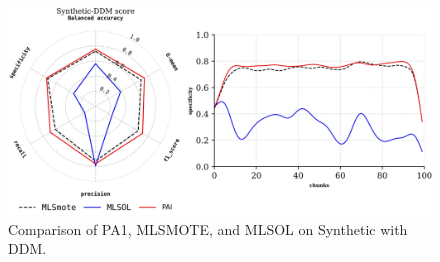\begin{figure}[H]
	\centering
	\includegraphics[width=0.8\linewidth]{4_Imbalanced/figures/exp_6.png}
  \caption{Comparison of PA1, MLSMOTE, and MLSOL on Synthetic with DDM.}
	\label{fig:4_first_proposal_result_exp_6}
\end{figure}


